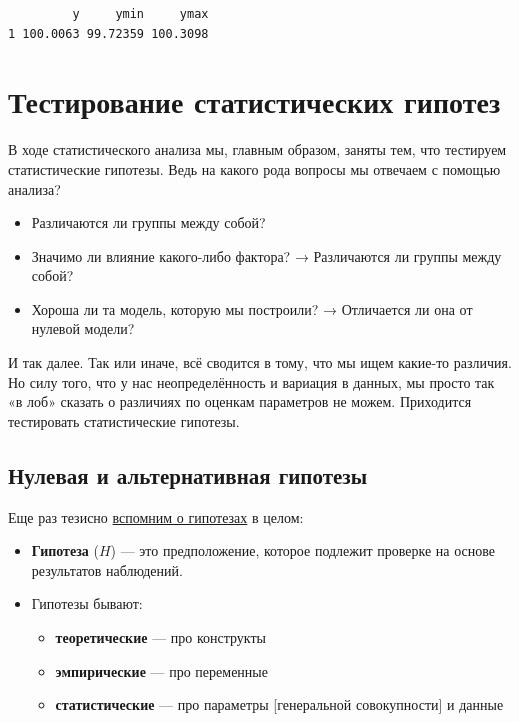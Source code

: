 \documentclass[
  letterpaper,
]{scrbook}
\providecommand{\tightlist}{%
  \setlength{\itemsep}{0pt}\setlength{\parskip}{0pt}}\usepackage{longtable,booktabs,array}
\theoremstyle{definition}
\theoremstyle{remark}
\begin{document}
\begin{verbatim}
         y     ymin     ymax
1 100.0063 99.72359 100.3098
\end{verbatim}


\chapter{Тестирование статистических гипотез}\label{stats-testing}

В ходе статистического анализа мы, главным образом, заняты тем, что
тестируем статистические гипотезы. Ведь на какого рода вопросы мы
отвечаем с помощью анализа?

\begin{itemize}
\tightlist
\item
  Различаются ли группы между собой?
\item
  Значимо ли влияние какого-либо фактора? → Различаются ли группы между
  собой?
\item
  Хороша ли та модель, которую мы построили? → Отличается ли она от
  нулевой модели?
\end{itemize}

И так далее. Так или иначе, всё сводится в тому, что мы ищем какие-то
различия. Но силу того, что у нас неопределённость и вариация в данных,
мы просто так «в лоб» сказать о различиях по оценкам параметров не
можем. Приходится тестировать статистические гипотезы.

\section{Нулевая и альтернативная
гипотезы}\label{stats-testing-hyotheses}

Еще раз тезисно \hyperref[stats-hypotheses]{вспомним о гипотезах} в
целом:

\begin{itemize}
\tightlist
\item
  \textbf{Гипотеза} (\(H\)) --- это предположение, которое подлежит
  проверке на основе результатов наблюдений.
\item
  Гипотезы бывают:

  \begin{itemize}
  \tightlist
  \item
    \textbf{теоретические} --- про конструкты
  \item
    \textbf{эмпирические} --- про переменные
  \item
    \textbf{статистические} --- про параметры {[}генеральной
    совокупности{]} и данные
  \end{itemize}
\end{itemize}
\end{document}
